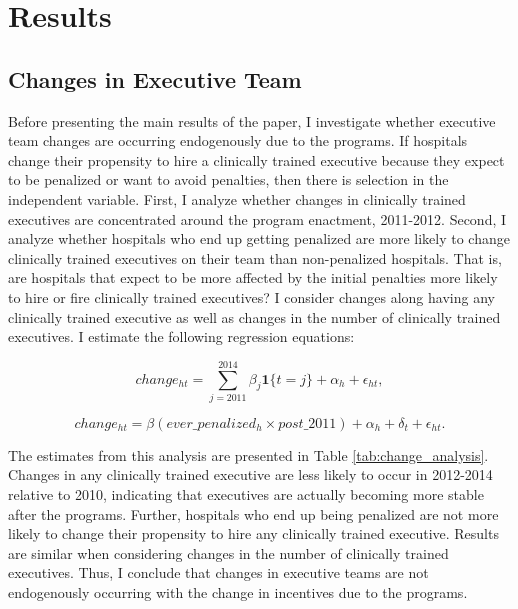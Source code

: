 \documentclass[12pt]{article}
\begin{document}
    \section{Results}

    \subsection{Changes in Executive Team}\label{sec:endog}

    Before presenting the main results of the paper, I investigate whether executive team changes are occurring endogenously due to the programs. If hospitals change their propensity to hire a clinically trained executive because they expect to be penalized or want to avoid penalties, then there is selection in the independent variable. First, I analyze whether changes in clinically trained executives are concentrated around the program enactment, 2011-2012. Second, I analyze whether hospitals who end up getting penalized are more likely to change clinically trained executives on their team than non-penalized hospitals. That is, are hospitals that expect to be more affected by the initial penalties more likely to hire or fire clinically trained executives? I consider changes along having any clinically trained executive as well as changes in the number of clinically trained executives. I estimate the following regression equations:

    \begin{equation}
    change_{ht} = \sum_{j=2011}^{2014}\beta_j\mathbf{1}\{t=j\} + \alpha_h + \epsilon_{ht},
    \end{equation}

    \begin{equation}
    change_{ht} = \beta(ever\_penalized_{h} \times post\_2011)+ \alpha_h + \delta_t + \epsilon_{ht}.
    \end{equation}

    The estimates from this analysis are presented in Table \ref{tab:change_analysis}. Changes in any clinically trained executive are less likely to occur in 2012-2014 relative to 2010, indicating that executives are actually becoming more stable after the programs. Further, hospitals who end up being penalized are not more likely to change their propensity to hire any clinically trained executive. Results are similar when considering changes in the number of clinically trained executives. Thus, I conclude that changes in executive teams are not endogenously occurring with the change in incentives due to the programs. 
\end{document}
